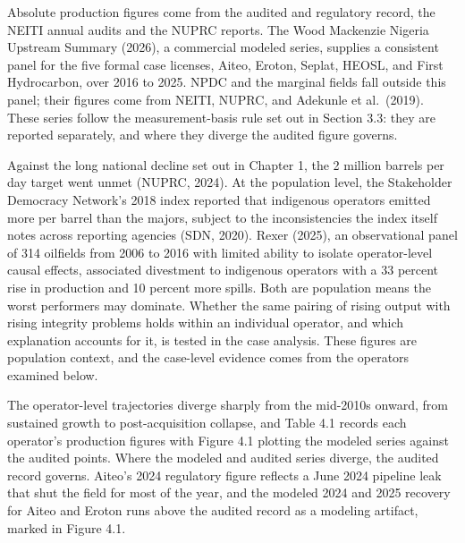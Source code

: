 \documentclass[twoside,fontset=lmodern]{mitthesis}
\begin{document}
Absolute production figures come from the audited and regulatory record,
the NEITI annual audits and the NUPRC reports. The Wood Mackenzie
Nigeria Upstream Summary (2026), a commercial modeled series, supplies a
consistent panel for the five formal case licenses, Aiteo, Eroton,
Seplat, HEOSL, and First Hydrocarbon, over 2016 to 2025. NPDC and the
marginal fields fall outside this panel; their figures come from NEITI,
NUPRC, and Adekunle et al.~(2019). These series follow the
measurement-basis rule set out in Section 3.3: they are reported
separately, and where they diverge the audited figure governs.

Against the long national decline set out in Chapter 1, the 2 million
barrels per day target went unmet (NUPRC, 2024). At the population
level, the Stakeholder Democracy Network's 2018 index reported that
indigenous operators emitted more per barrel than the majors, subject to
the inconsistencies the index itself notes across reporting agencies
(SDN, 2020). Rexer (2025), an observational panel of 314 oilfields from
2006 to 2016 with limited ability to isolate operator-level causal
effects, associated divestment to indigenous operators with a 33 percent
rise in production and 10 percent more spills. Both are population means
the worst performers may dominate. Whether the same pairing of rising
output with rising integrity problems holds within an individual
operator, and which explanation accounts for it, is tested in the case
analysis. These figures are population context, and the case-level
evidence comes from the operators examined below.

The operator-level trajectories diverge sharply from the mid-2010s
onward, from sustained growth to post-acquisition collapse, and Table
4.1 records each operator's production figures with Figure 4.1 plotting
the modeled series against the audited points. Where the modeled and
audited series diverge, the audited record governs. Aiteo's 2024
regulatory figure reflects a June 2024 pipeline leak that shut the field
for most of the year, and the modeled 2024 and 2025 recovery for Aiteo
and Eroton runs above the audited record as a modeling artifact, marked
in Figure 4.1.
\end{document}
